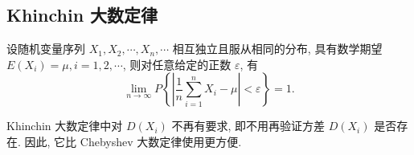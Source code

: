 \subsection{Khinchin 大数定律}

\begin{theorem}
    设随机变量序列 $ X_{1}, X_{2}, \cdots, X_{n}, \cdots $ 相互独立且服从相同的分布, 具有数学期望 $ E\left(X_{i}\right)=\mu, i=1,2, \cdots $, 则对任意给定的正数 $ \varepsilon $, 有
    $$\lim _{n \rightarrow \infty} P\left\{\left|\frac{1}{n} \sum_{i=1}^{n} X_{i}-\mu\right|<\varepsilon\right\}=1 .$$
\end{theorem}

Khinchin 大数定律中对 $ D\left(X_{i}\right) $ 不再有要求, 即不用再验证方差 $ D\left(X_{i}\right) $ 是否存在. 
因此, 它比 Chebyshev 大数定律使用更方便.